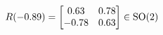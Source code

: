 \documentclass[preview]{standalone}
\begin{document}
\begin{align*}
\special{dvisvgm:raw <g id='unique000'>}R(-0.89) = \begin{bmatrix} 0.63 & 0.78 \\ -0.78 & 0.63 \end{bmatrix} \in \text{SO}(2)\special{dvisvgm:raw </g>}
\end{align*}
\end{document}
